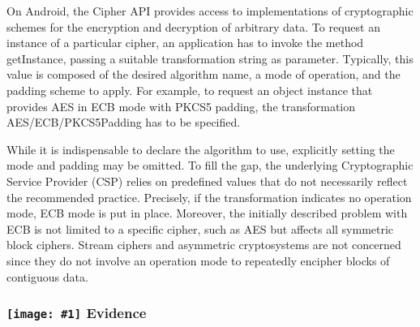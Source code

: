\documentclass[12p]{article}
\newcommand{\icon}[1]{\texttt{[image: \#1]}}
\begin{document}
            On Android, the Cipher API provides access to implementations of cryptographic schemes
            for the encryption and decryption of arbitrary data. To request an instance of a particular cipher,
            an application has to invoke the method getInstance, passing a suitable transformation string as
            parameter. Typically, this value is composed of the desired algorithm name, a mode of operation,
            and the padding scheme to apply. For example, to request an object instance that provides AES in
            ECB mode with PKCS5 padding, the transformation AES/ECB/PKCS5Padding has to be specified.
            
            While it is indispensable to declare the algorithm to use, explicitly setting the mode and
            padding may be omitted. To fill the gap, the underlying Cryptographic Service Provider (CSP)
            relies on predefined values that do not necessarily reflect the recommended practice. Precisely, if
            the transformation indicates no operation mode, ECB mode is put in place. Moreover, the initially
            described problem with ECB is not limited to a specific cipher, such as AES but affects all symmetric
            block ciphers. Stream ciphers and asymmetric cryptosystems are not concerned since they
            do not involve an operation mode to repeatedly encipher blocks of contiguous data.
        
\subsubsection*{\protect\icon{/home/miki/Documents/GITHUB/AndroidPermissions/python/vulns/report_icons/basic_magnifier.png} Evidence}




\end{document}
